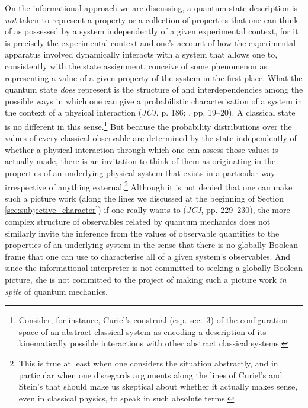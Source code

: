 \documentclass[12pt,english,twoside]{article}
\numberwithin{equation}{section}
\begin{document}
On the informational approach we are discussing, a quantum state description is \emph{not} taken to represent a property or a collection of properties that one can think of as possessed by a system independently of a given experimental context, for it is precisely the experimental context and one's account of how the experimental apparatus involved dynamically interacts with a system that allows one to, consistently with the state assignment, conceive of some phenomenon as representing a value of a given property of the system in the first place. What the quantum state \emph{does} represent is the structure of and interdependencies among the possible ways in which one can give a probabilistic characterisation of a system in the context of a physical interaction (\emph{JCJ}, p. 186; \citealt[]{cuffaroHartmannOpenSystemsView}, pp. 19--20). A classical state is no different in this sense.\footnote{Consider, for instance, Curiel's \citeyearpar[]{curiel2014} construal (esp. sec.\ 3) of the configuration space of an abstract classical system as encoding a description of its kinematically possible interactions with other abstract classical systems.} But because the probability distributions over the values of every classical observable are determined by the state independently of whether a physical interaction through which one can assess those values is actually made, there is an invitation to think of them as originating in the properties of an underlying physical system that exists in a particular way irrespective of anything external.\footnote{This is true at least when one considers the situation abstractly, and in particular when one disregards arguments along the lines of Curiel's and Stein's that should make us skeptical about whether it actually makes sense, even in classical physics, to speak in such absolute terms.} Although it is not denied that one can make such a picture work (along the lines we discussed at the beginning of Section \ref{sec:subjective_character}) if one really wants to (\emph{JCJ}, pp. 229--230), the more complex structure of observables related by quantum mechanics does not similarly invite the inference from the values of observable quantities to the properties of an underlying system in the sense that there is no globally Boolean frame that one can use to characterise all of a given system's observables. And since the informational interpreter is not committed to seeking a globally Boolean picture, she is not committed to the project of making such a picture work \emph{in spite} of quantum mechanics.
\end{document}
